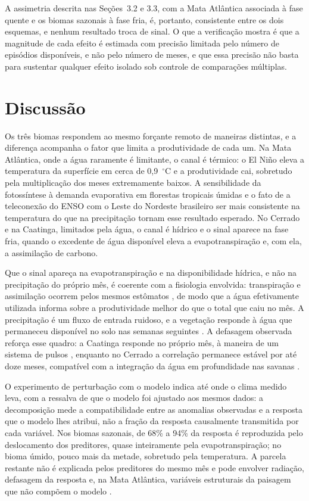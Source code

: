 \documentclass[a4paper,fleqn]{cas-sc}
\begin{document}
A assimetria descrita nas Seções~3.2 e 3.3, com a Mata Atlântica associada à fase quente e os biomas sazonais à fase fria, é, portanto, consistente entre os dois esquemas, e nenhum resultado troca de sinal. O que a verificação mostra é que a magnitude de cada efeito é estimada com precisão limitada pelo número de episódios disponíveis, e não pelo número de meses, e que essa precisão não basta para sustentar qualquer efeito isolado sob controle de comparações múltiplas.

\section{Discussão}

Os três biomas respondem ao mesmo forçante remoto de maneiras distintas, e a diferença acompanha o fator que limita a produtividade de cada um. Na Mata Atlântica, onde a água raramente é limitante, o canal é térmico: o El Niño eleva a temperatura da superfície em cerca de 0,9~$^{\circ}$C e a produtividade cai, sobretudo pela multiplicação dos meses extremamente baixos. A sensibilidade da fotossíntese à demanda evaporativa em florestas tropicais úmidas \citep{lawson2019, vourlitis2022} e o fato de a teleconexão do ENSO com o Leste do Nordeste brasileiro ser mais consistente na temperatura do que na precipitação \citep{ropelewski1987, kayano2007} tornam esse resultado esperado. No Cerrado e na Caatinga, limitados pela água, o canal é hídrico e o sinal aparece na fase fria, quando o excedente de água disponível eleva a evapotranspiração e, com ela, a assimilação de carbono.

Que o sinal apareça na evapotranspiração e na disponibilidade hídrica, e não na precipitação do próprio mês, é coerente com a fisiologia envolvida: transpiração e assimilação ocorrem pelos mesmos estômatos \citep{lawson2019}, de modo que a água efetivamente utilizada informa sobre a produtividade melhor do que o total que caiu no mês. A precipitação é um fluxo de entrada ruidoso, e a vegetação responde à água que permaneceu disponível no solo nas semanas seguintes \citep{oliveira2005, schwinning2004}. A defasagem observada reforça esse quadro: a Caatinga responde no próprio mês, à maneira de um sistema de pulsos \citep{schwinning2004, mendes2020}, enquanto no Cerrado a correlação permanece estável por até doze meses, compatível com a integração da água em profundidade nas savanas \citep{oliveira2005, bucci2008}.

O experimento de perturbação com o modelo indica até onde o clima medido leva, com a ressalva de que o modelo foi ajustado aos mesmos dados: a decomposição mede a compatibilidade entre as anomalias observadas e a resposta que o modelo lhes atribui, não a fração da resposta causalmente transmitida por cada variável. Nos biomas sazonais, de 68\% a 94\% da resposta é reproduzida pelo deslocamento dos preditores, quase inteiramente pela evapotranspiração; no bioma úmido, pouco mais da metade, sobretudo pela temperatura. A parcela restante não é explicada pelos preditores do mesmo mês e pode envolver radiação, defasagem da resposta e, na Mata Atlântica, variáveis estruturais da paisagem que não compõem o modelo \citep{broggio2024, ribeiro2009}.
\end{document}
